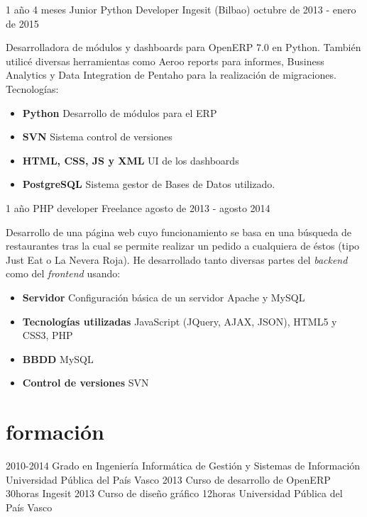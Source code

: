 \documentclass[]{friggeri-cv} %
\begin{document}
\begin{entrylist}
\entry
{1 año 4 meses}
{Junior Python Developer {\normalfont Ingesit (Bilbao)}}
{octubre de 2013 - enero de 2015}
{Desarrolladora de m\'odulos y dashboards para OpenERP 7.0 en Python. Tambi\'en utilic\'e diversas herramientas como Aeroo reports para informes, Business Analytics y Data Integration de Pentaho para la realizaci\'on de migraciones. Tecnolog\'ias:
\begin{itemize}
\item\textbf{Python} Desarrollo de módulos para el ERP
\item\textbf{SVN} Sistema control de versiones
\item\textbf{HTML, CSS, JS y XML} UI de los dashboards
\item\textbf{PostgreSQL} Sistema gestor de Bases de Datos utilizado.\\
\end{itemize}}
\end{entrylist}

\begin{entrylist}
\entry
{1 año}
{PHP developer {\normalfont Freelance}}
{agosto de 2013 - agosto 2014}
{Desarrollo de una p\'agina web cuyo funcionamiento se basa en una b\'usqueda de restaurantes tras la cual se permite realizar un pedido a cualquiera de \'estos (tipo Just Eat o La Nevera Roja). He desarrollado tanto diversas partes del \textit{backend} como del \textit{frontend} usando:
\begin{itemize}
\item\textbf{Servidor} Configuraci\'on b\'asica de un servidor Apache y MySQL
\item\textbf{Tecnolog\'ias utilizadas} JavaScript (JQuery, AJAX, JSON), HTML5 y CSS3, PHP
\item\textbf{BBDD}	MySQL
\item\textbf{Control de versiones} SVN\\
\end{itemize}}
\end{entrylist}
\section{formaci\'on}
\begin{entrylist}
\entry
{2010-2014}
{Grado en Ingenier\'ia Inform\'atica {\normalfont de Gesti\'on y Sistemas de Informaci\'on}}
{}
{Universidad P\'ublica del Pa\'is Vasco}
\entry
{2013}
{Curso de desarrollo de OpenERP}
{30horas}
{Ingesit}
\entry
{2013}
{Curso de diseño gr\'afico}
{12horas}
{Universidad P\'ublica del Pa\'is Vasco}
\end{entrylist}
\end{document}

